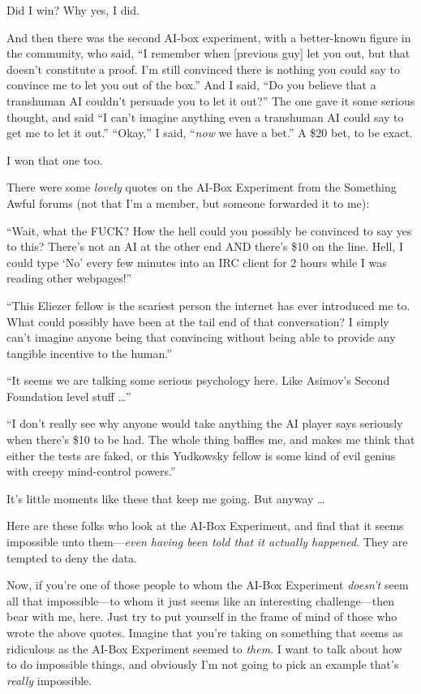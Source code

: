 {
 Did I win? Why yes, I did.}

{
 And then there was the second AI-box experiment, with a
better-known figure in the community, who said, ``I
remember when [previous guy] let you out, but that
doesn't constitute a proof. I'm still
convinced there is nothing you could say to convince me to let you out
of the box.'' And I said, ``Do you
believe that a transhuman AI couldn't persuade you to
let it out?'' The one gave it some serious thought,
and said ``I can't imagine anything
even a transhuman AI could say to get me to let it
out.'' ``Okay,'' I
said, ``\textit{now} we have a
bet.'' A \$20 bet, to be exact.}

{
 I won that one too.}

{
 There were some \textit{lovely} quotes on the AI-Box Experiment
from the Something Awful forums (not that I'm a member,
but someone forwarded it to me):}

{
 ``Wait, what the FUCK? How the hell could you
possibly be convinced to say yes to this? There's not
an AI at the other end AND there's \$10 on the line.
Hell, I could type `No' every few
minutes into an IRC client for 2 hours while I was reading other
webpages!''}

{
 ``This Eliezer fellow is the scariest person the
internet has ever introduced me to. What could possibly have been at
the tail end of that conversation? I simply can't
imagine anyone being that convincing without being able to provide any
tangible incentive to the human.''}

{
 ``It seems we are talking some serious psychology
here. Like Asimov's Second Foundation level stuff
\ldots''}

{
 ``I don't really see why anyone
would take anything the AI player says seriously when
there's \$10 to be had. The whole thing baffles me, and
makes me think that either the tests are faked, or this Yudkowsky
fellow is some kind of evil genius with creepy mind-control
powers.''}

{
 It's little moments like these that keep me going.
But anyway \ldots}

{
 Here are these folks who look at the AI-Box Experiment, and find
that it seems impossible unto them---\textit{even having been told that
it actually happened}. They are tempted to deny the data.}

{
 Now, if you're one of those people to whom the
AI-Box Experiment \textit{doesn't} seem all that
impossible---to whom it just seems like an interesting challenge---then
bear with me, here. Just try to put yourself in the frame of mind of
those who wrote the above quotes. Imagine that you're
taking on something that seems as ridiculous as the AI-Box Experiment
seemed to \textit{them}. I want to talk about how to do impossible
things, and obviously I'm not going to pick an example
that's \textit{really} impossible.}


